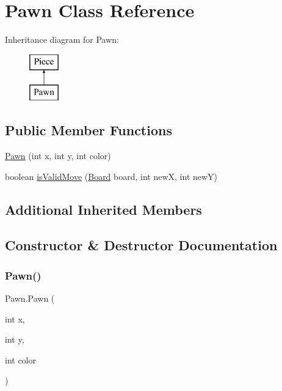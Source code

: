 \hypertarget{class_pawn}{}\section{Pawn Class Reference}
\label{class_pawn}
Inheritance diagram for Pawn\+:\begin{figure}[H]
\begin{center}
\leavevmode
\includegraphics[height=2.000000cm]{class_pawn}
\end{center}
\end{figure}
\subsection*{Public Member Functions}
\begin{DoxyCompactItemize}
\item 
\mbox{\hyperlink{class_pawn_ad29fc64d84f739809c0162192498c38a}{Pawn}} (int x, int y, int color)
\item 
boolean \mbox{\hyperlink{class_pawn_a7c445d4ea5aebdc0a508e02b4db2e019}{is\+Valid\+Move}} (\mbox{\hyperlink{class_board}{Board}} board, int newX, int newY)
\end{DoxyCompactItemize}
\subsection*{Additional Inherited Members}


\subsection{Constructor \& Destructor Documentation}
\mbox{\label{class_pawn_ad29fc64d84f739809c0162192498c38a}} 
\subsubsection{\texorpdfstring{Pawn()}{Pawn()}}
{\footnotesize\ttfamily Pawn.\+Pawn (\begin{DoxyParamCaption}\item[{int}]{x,  }\item[{int}]{y,  }\item[{int}]{color }\end{DoxyParamCaption})\hspace{0.3cm}{\ttfamily [inline]}}


